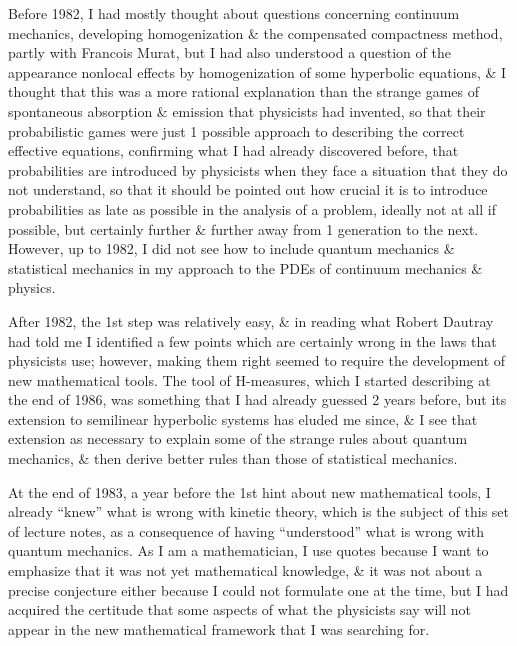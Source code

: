\documentclass{article}
\begin{document}
\begin{enumerate}
	Before 1982, I had mostly thought about questions concerning continuum mechanics, developing homogenization \& the compensated compactness method, partly with {\sc Francois Murat}, but I had also understood a question of the appearance nonlocal effects by homogenization of some hyperbolic equations, \& I thought that this was a more rational explanation than the strange games of spontaneous absorption \& emission that physicists had invented, so that their probabilistic games were just 1 possible approach to describing the correct effective equations, confirming what I had already discovered before, that probabilities are introduced by physicists when they face a situation that they do not understand, so that it should be pointed out how crucial it is to introduce probabilities as late as possible in the analysis of a problem, ideally not at all if possible, but certainly further \& further away from 1 generation to the next. However, up to 1982, I did not see how to include quantum mechanics \& statistical mechanics in my approach to the PDEs of continuum mechanics \& physics.
	
	After 1982, the 1st step was relatively easy, \& in reading what {\sc Robert Dautray} had told me I identified a few points which are certainly wrong in the laws that physicists use; however, making them right seemed to require the development of new mathematical tools. The tool of H-measures, which I started describing at the end of 1986, was something that I had already guessed 2 years before, but its extension to semilinear hyperbolic systems has eluded me since, \& I see that extension as necessary to explain some of the strange rules about quantum mechanics, \& then derive better rules than those of statistical mechanics.
	
	At the end of 1983, a year before the 1st hint about new mathematical tools, I already ``knew'' what is wrong with kinetic theory, which is the subject of this set of lecture notes, as a consequence of having ``understood'' what is wrong with quantum mechanics. As I am a mathematician, I use quotes because I want to emphasize that it was not yet mathematical knowledge, \& it was not about a precise conjecture either because I could not formulate one at the time, but I had acquired the certitude that some aspects of what the physicists say will not appear in the new mathematical framework that I was searching for.
	

\end{enumerate}
\end{document}
